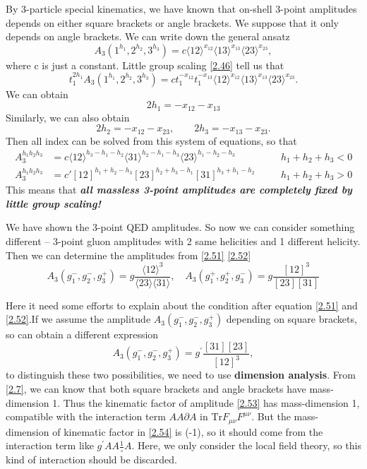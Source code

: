 \documentclass[12pt]{article}
\numberwithin{equation}{section}
\newcommand{\avg}[1]{\langle #1 \rangle}
\begin{document}
\noindent
By 3-particle special kinematics, we have known that on-shell 3-point amplitudes depends on either square brackets or
angle brackets. We suppose that it only depends on angle brackets. We can write down the general ansatz
\begin{equation}
     A_3(1^{h_1},2^{h_2},3^{h_3})=c\avg{12}^{x_{12}}\avg{13}^{x_{13}}\avg{23}^{x_{23}},
\end{equation}
where c is just a constant. Little group scaling \eqref{2.46} tell us that
\begin{equation}
    t_1^{2h_1} A_3(1^{h_1},2^{h_2},3^{h_3})=ct_1^{-x_{12}}t_1^{-x_{13}}\avg{12}^{x_{12}}\avg{13}^{x_{13}}\avg{23}^{x_{23}}.
\end{equation}
We can obtain
    \begin{equation}
        2h_1=-x_{12}-x_{13}
    \end{equation}
    Similarly, we can also obtain
    \begin{equation}
        2h_2=-x_{12}-x_{23},\qquad 2h_3=-x_{13}-x_{23}.
    \end{equation}
    Then all index can be solved from this system of equations, so that
 \begin{align}
    A_3^{h_1h_2h_3} &= c\langle12\rangle^{h_3-h_1-h_2} \langle31\rangle^{h_2-h_1-h_3} \langle23\rangle^{h_1-h_2-h_3}
    && \quad h_1 + h_2 + h_3 < 0 \label{2.51}\\[0.5em] 
    A_3^{h_1h_2h_3} &= c' [12]^{h_1+h_2-h_3}[23]^{h_2+h_3-h_1}[31]^{h_3+h_1-h_2}
    && \quad h_1 + h_2 + h_3 > 0 \label{2.52}
\end{align}
This means that \textit{\textbf{all massless 3-point amplitudes are completely fixed by little group scaling!}}

We have shown the 3-point QED amplitudes. So now we can consider something different -- 3-point gluon amplitudes with 2 same helicities and 1 different helicity.
Then we can determine the amplitudes from \eqref{2.51} \eqref{2.52}
\begin{equation}
    A_3(g_1^-,g_2^-,g_3^+)=g\frac{\avg{12}^3}{\avg{23}\!\avg{31}}, \quad A_3(g_1^+,g_2^+,g_3^-)=g\frac{[12]^3}{[23][31]} \label{2.53}
\end{equation}

Here it need some efforts to explain about the condition after equation \eqref{2.51} and \eqref{2.52}.If we assume the amplitude
$A_3(g_1^-,g_2^-,g_3^+)$ depending on square brackets, so can obtain a different expression
\begin{equation}
    A_3(g_1^-,g_2^-,g_3^+)=g^{'}\frac{[31][23]}{[12]^3},
    \label{2.54}
\end{equation}
to distinguish these two possibilities, we need to use \textbf{dimension analysis}. From \eqref{2.7}, we can know that both square brackets and angle brackets have mass-dimension 1. 
Thus the kinematic factor of amplitude \eqref{2.53} has mass-dimension 1, compatible with the interaction term $AA\partial A$ in $\mathrm{Tr}F_{\mu\nu}F^{\mu\nu}$. But the mass-dimension 
of kinematic factor in \eqref{2.54} is (-1), so it should come from the interaction term like $g^{'}AA\frac{1}{\square }A$. Here, we only consider the local field theory, so this kind of interaction
should be discarded.
\end{document}

